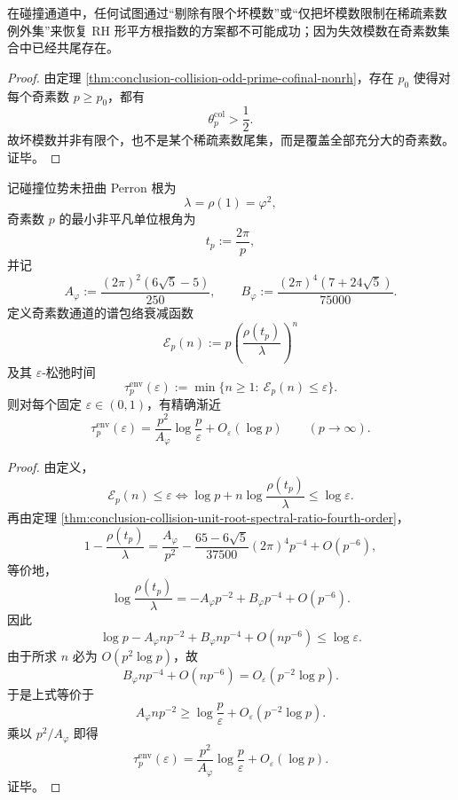 \begin{corollary}[素模例外集方案的破产]\label{cor:conclusion-prime-modulus-exception-scheme-collapse}
在碰撞通道中，任何试图通过“剔除有限个坏模数”或“仅把坏模数限制在稀疏素数例外集”来恢复 RH 形平方根指数的方案都不可能成功；因为失效模数在奇素数集合中已经共尾存在。
\end{corollary}
\begin{proof}
由定理 \ref{thm:conclusion-collision-odd-prime-cofinal-nonrh}，存在 \(p_0\) 使得对每个奇素数 \(p\ge p_0\)，都有
\[
\theta_p^{\mathrm{col}}>\frac12.
\]
故坏模数并非有限个，也不是某个稀疏素数尾集，而是覆盖全部充分大的奇素数。证毕。
\end{proof}

\begin{theorem}[奇素数扭曲的二次松弛时间律]\label{thm:conclusion-odd-prime-twist-quadratic-relaxation-time}
记碰撞位势未扭曲 Perron 根为
\[
\lambda=\rho(1)=\varphi^2,
\]
奇素数 \(p\) 的最小非平凡单位根角为
\[
t_p:=\frac{2\pi}{p},
\]
并记
\[
A_\varphi:=\frac{(2\pi)^2(6\sqrt5-5)}{250},
\qquad
B_\varphi:=\frac{(2\pi)^4(7+24\sqrt5)}{75000}.
\]
定义奇素数通道的谱包络衰减函数
\[
\mathcal E_p(n):=
p\left(\frac{\rho(t_p)}{\lambda}\right)^n
\]
及其 \(\varepsilon\)-松弛时间
\[
\tau_p^{\mathrm{env}}(\varepsilon)
:=
\min\{n\ge 1:\ \mathcal E_p(n)\le \varepsilon\}.
\]
则对每个固定 \(\varepsilon\in(0,1)\)，有精确渐近
\[
\tau_p^{\mathrm{env}}(\varepsilon)
=
\frac{p^2}{A_\varphi}\log\frac{p}{\varepsilon}
+O_\varepsilon(\log p)
\qquad (p\to\infty).
\]
\end{theorem}
\begin{proof}
由定义，
\[
\mathcal E_p(n)\le \varepsilon
\iff
\log p+n\log\frac{\rho(t_p)}{\lambda}\le \log\varepsilon.
\]
再由定理 \ref{thm:conclusion-collision-unit-root-spectral-ratio-fourth-order}，
\[
1-\frac{\rho(t_p)}{\lambda}
=
\frac{A_\varphi}{p^2}-\frac{65-6\sqrt5}{37500}(2\pi)^4p^{-4}+O(p^{-6}),
\]
等价地，
\[
\log\frac{\rho(t_p)}{\lambda}
=
-A_\varphi p^{-2}+B_\varphi p^{-4}+O(p^{-6}).
\]
因此
\[
\log p
-A_\varphi n p^{-2}
+B_\varphi n p^{-4}
+O(np^{-6})
\le \log\varepsilon.
\]
由于所求 \(n\) 必为 \(O(p^2\log p)\)，故
\[
B_\varphi n p^{-4}+O(np^{-6})=O_\varepsilon(p^{-2}\log p).
\]
于是上式等价于
\[
A_\varphi n p^{-2}
\ge
\log\frac{p}{\varepsilon}
+O_\varepsilon(p^{-2}\log p).
\]
乘以 \(p^2/A_\varphi\) 即得
\[
\tau_p^{\mathrm{env}}(\varepsilon)
=
\frac{p^2}{A_\varphi}\log\frac{p}{\varepsilon}
+O_\varepsilon(\log p).
\]
证毕。
\end{proof}

